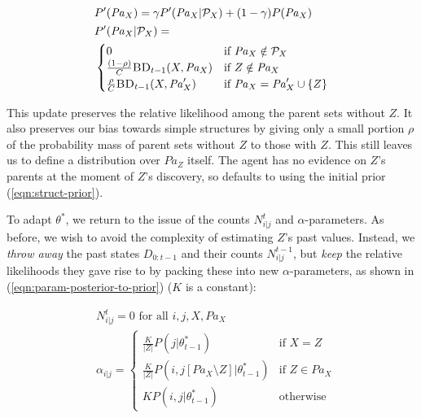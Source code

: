 \documentclass{article}
\newcommand{\Pa}{\mathit{Pa}}
\begin{document}
	\begin{align}
	\label{eqn:old-parent-sets-new-vocab}
	&P'(\Pa_X) = \gamma P'(\Pa_X | \mathcal{P}_X) + (1 - \gamma) P(\Pa_X)\\
	&\begin{aligned}
	&P'(\Pa_X | \mathcal{P}_X) = \\
	&\begin{cases}
	0 & \text{if } \Pa_X \notin \mathcal{P}_X \\
	\frac{(1 - \rho)}{C} \textsc{BD}_{t-1}(X, \Pa_X) & \text{if } Z \notin \Pa_X \\
	\frac{\rho}{C} \textsc{BD}_{t-1}(X, \Pa'_X) & \text{if } \Pa_X = \Pa'_X \cup \{ Z \}
	\end{cases}
	\end{aligned}
	\end{align}
		
	This update preserves the relative likelihood among the parent sets without $Z$. It also preserves our bias towards simple structures by giving only a small portion $\rho$ of the probability mass of parent sets without $Z$ to those with $Z$. This still leaves us to define a distribution over $\Pa_{Z}$ itself. The agent has no evidence on $Z$'s parents at the moment of $Z$'s discovery, so defaults to using the initial prior (\ref{eqn:struct-prior}).
	
	To adapt $\theta^*$, we return to the issue of the counts $N^t_{i | j}$ and $\alpha$-parameters. As before, we wish to avoid the complexity of estimating $Z$'s past values. Instead, we \emph{throw away} the past states $D_{0:t-1}$ and their counts $N^{t-1}_{i | j}$, but \emph{keep} the relative likelihoods they gave rise to by packing these into new $\alpha$-parameters, as shown in (\ref{eqn:param-posterior-to-prior}) ($K$ is a constant):
	
	\begin{equation}
	\label{eqn:param-posterior-to-prior}
	\begin{aligned}
	&N^t_{i | j} = 0 \text{ for all } i,j, X, \Pa_X \\
	&\alpha_{i | j} = 
	\begin{cases}
	\frac{K}{|Z|}  P(j \rvert \theta^*_{t-1}) & \text{if } X = Z \\
	\frac{K}{|Z|}  P(i, j[\Pa_X \setminus Z] \rvert \theta^*_{t-1}) & \text{if } Z \in \Pa_{X}\\
	K  P(i, j \rvert \theta^*_{t-1}) & \text{otherwise}
	\end{cases}
	\end{aligned}
	\end{equation}
	
\end{document}
